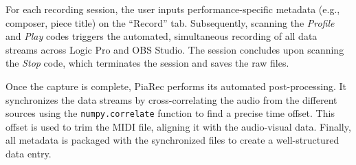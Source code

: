 \documentclass{article}
\begin{document}
For each recording session, the user inputs performance-specific metadata (e.g., composer, piece title) on the ``Record'' tab. Subsequently, scanning the \emph{Profile} and \emph{Play} codes triggers the automated, simultaneous recording of all data streams across Logic Pro and OBS Studio. The session concludes upon scanning the \emph{Stop} code, which terminates the session and saves the raw files.

Once the capture is complete, PiaRec performs its automated post-processing. It synchronizes the data streams by cross-correlating the audio from the different sources using the \texttt{numpy.correlate} function to find a precise time offset. This offset is used to trim the MIDI file, aligning it with the audio-visual data. Finally, all metadata is packaged with the synchronized files to create a well-structured data entry. %



\end{document}
